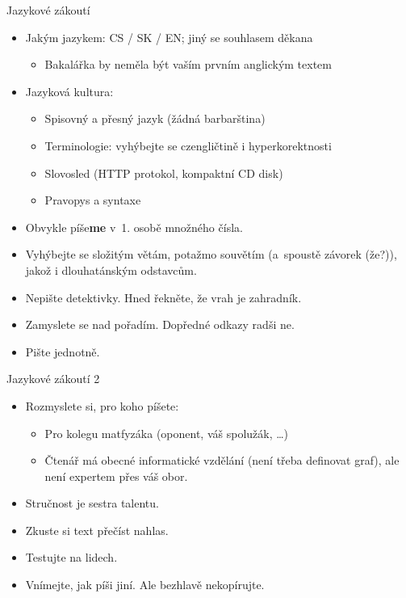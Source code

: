 \documentclass{beamer}
\begin{document}
\begin{frame}{Jazykové zákoutí}

\begin{itemize}
\item Jakým jazykem: CS / SK / EN; jiný se souhlasem děkana
   \begin{itemize}
   \item Bakalářka by neměla být vaším prvním anglickým textem
   \end{itemize}
\item Jazyková kultura:
   \begin{itemize}
   \item Spisovný a přesný jazyk (žádná barbarština)
   \item Terminologie: vyhýbejte se czengličtině i hyperkorektnosti
   \item Slovosled (HTTP protokol, kompaktní CD disk)
   \item Pravopys a syntaxe
   \end{itemize}
\item Obvykle píše{\bf me} v~1. osobě množného čísla.
\item Vyhýbejte se složitým větám, potažmo souvětím (a~spoustě
   závorek (že?)), jakož i dlouhatánským odstavcům.
\item Nepište detektivky. Hned řekněte, že vrah je zahradník.
\item Zamyslete se nad pořadím. Dopředné odkazy radši ne.
\item Pište jednotně.
\end{itemize}

\end{frame}

\begin{frame}{Jazykové zákoutí 2}

\begin{itemize}
\item Rozmyslete si, pro koho píšete:
   \begin{itemize}
   \item Pro kolegu matfyzáka (oponent, váš spolužák, \dots)
   \item Čtenář má obecné informatické vzdělání (není třeba definovat graf),
         ale není expertem přes váš obor.
   \end{itemize}
\item Stručnost je sestra talentu.
\item Zkuste si text přečíst nahlas.
\item Testujte na lidech.
\item Vnímejte, jak píši jiní. Ale bezhlavě nekopírujte.
\end{itemize}

\end{frame}
\end{document}
